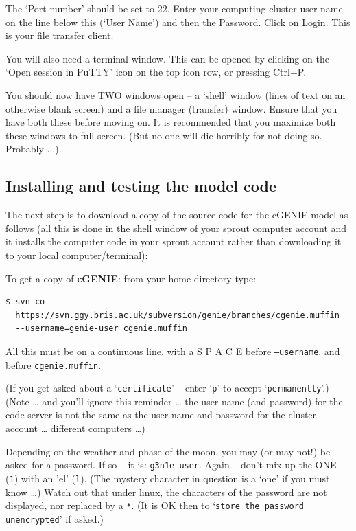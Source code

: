 \documentclass[11pt,fleqn]{book} %
\begin{document}
The ‘Port number’ should be set to 22. Enter your computing cluster user-name on the line below this (‘User Name’) and then the Password. Click on Login. This is your file transfer client.

You will also need a terminal window. This can be opened by clicking on the ‘Open session in PuTTY’ icon on the top icon row, or pressing Ctrl+P. 

You should now have TWO windows open – a ‘shell’ window (lines of text on an otherwise blank screen) and a file manager (transfer) window. Ensure that you have both these before moving on. It is recommended that you maximize both these windows to full screen. (But no-one will die horribly for not doing so. Probably ...).


\subsection{Installing and testing the model code}

The next step is to download a copy of the source code for the cGENIE model as follows (all this is done in the shell window of your sprout computer account and it installs the computer code in your sprout account rather than downloading it to your local computer/terminal):

To get a copy of \textbf{cGENIE}: from your home directory type:

\begin{verbatim}
$ svn co
  https://svn.ggy.bris.ac.uk/subversion/genie/branches/cgenie.muffin
  --username=genie-user cgenie.muffin
\end{verbatim}

All this must be on a continuous line, with a S P A C E before \texttt{--username}, and before \texttt{cgenie.muffin}.

(If you get asked about a ‘\texttt{certificate}’ – enter ‘\texttt{p}’ to accept ‘\texttt{permanently}’.)
(Note … and you’ll ignore this reminder … the user-name (and password) for the code server is not the same as the user-name and password for the cluster account … different computers …)

Depending on the weather and phase of the moon, you may (or may not!) be asked for a password. If so – it is: \texttt{g3n1e-user}. Again – don’t mix up the ONE (\texttt{1}) with an ’el’ (\texttt{l}). (The mystery character in question is a ‘one’ if you must know …) Watch out that under linux, the characters of the password are not displayed, nor replaced by a \texttt{*}. (It is OK then to ‘\texttt{store the password unencrypted}’ if asked.)
\end{document}
